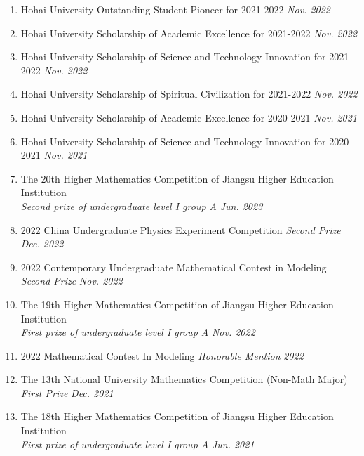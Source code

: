 \documentclass[12pt]{article}
\begin{document}
\begin{enumerate}
    \item Hohai University Outstanding Student Pioneer for 2021-2022 \hfill \textit{Nov. 2022} %
    \item Hohai University Scholarship of Academic Excellence for 2021-2022 \hfill \textit{Nov. 2022} %
    \item Hohai University Scholarship of Science and Technology Innovation for 2021-2022 \hfill \textit{Nov. 2022} %
    \item Hohai University Scholarship of Spiritual Civilization for 2021-2022 \hfill \textit{Nov. 2022} %
    \item Hohai University Scholarship of Academic Excellence for 2020-2021 \hfill \textit{Nov. 2021} %
    \item Hohai University Scholarship of Science and Technology Innovation for 2020-2021 \hfill \textit{Nov. 2021} %
          \\
    \item The 20th Higher Mathematics Competition of Jiangsu Higher Education Institution \\ \textit{Second prize of undergraduate level I group A} \hfill \textit{Jun. 2023} %
    \item 2022 China Undergraduate Physics Experiment Competition \textit{Second Prize}  \hfill \textit{Dec. 2022} %
    \item 2022 Contemporary Undergraduate Mathematical Contest in Modeling \textit {Second Prize} \hfill \textit{Nov. 2022} %
    \item The 19th Higher Mathematics Competition of Jiangsu Higher Education Institution \\ \textit{First prize of undergraduate level I group A} \hfill \textit{Nov. 2022} %
    \item 2022 Mathematical Contest In Modeling \textit{Honorable Mention} \hfill \textit{2022} %
    \item The 13th National University Mathematics Competition (Non-Math Major) \textit {First Prize} \hfill \textit{Dec. 2021} %
    \item The 18th Higher Mathematics Competition of Jiangsu Higher Education Institution \\ \textit{First prize of undergraduate level I group A} \hfill \textit{Jun. 2021} %
\end{enumerate}
\end{document}

